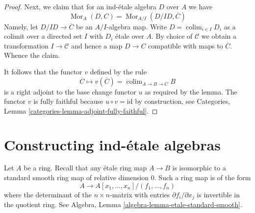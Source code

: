 \documentclass{stacks-project}
\theoremstyle{plain}
\theoremstyle{definition}
\theoremstyle{remark}
\numberwithin{equation}{subsection}
\def\colim{\mathop{\mathrm{colim}}\nolimits}
\def\Mor{\mathop{\mathrm{Mor}}\nolimits}
\begin{document}
\begin{proof}
\medskip\noindent
Next, we claim that for an ind-\'etale algebra $D$ over $A$ we have
$$
\Mor_A(D, C) = \Mor_{A/I}(D/ID, \overline{C})
$$
Namely, let $D/ID \to \overline{C}$ be an $A/I$-algebra map.
Write $D = \colim_{i \in I} D_i$ as a colimit over a directed set $I$
with $D_i$ \'etale over $A$. By choice of $\mathcal{C}$
we obtain a transformation $I \to \mathcal{C}$ and hence a map
$D \to C$ compatible with maps to $\overline{C}$. Whence the claim.

\medskip\noindent
It follows that the functor $v$ defined by the rule
$$
\overline{C} 
\longmapsto
v(\overline{C}) = \colim_{A \to B \to \overline{C}} B
$$
is a right adjoint to the base change functor $u$ as required by the lemma.
The functor $v$ is fully faithful because
$u \circ v = \text{id}$ by construction, see
Categories, Lemma \ref{categories-lemma-adjoint-fully-faithful}.
\end{proof}









\section{Constructing ind-\'etale algebras}
\label{section-construction-ind-etale}

\noindent
Let $A$ be a ring. Recall that any \'etale ring map $A \to B$ is isomorphic
to a standard smooth ring map of relative dimension $0$. Such a ring map
is of the form
$$
A \longrightarrow A[x_1, \ldots, x_n]/(f_1, \ldots, f_n)
$$
where the determinant of the $n \times n$-matrix with entries
$\partial f_i/\partial x_j$ is invertible in the quotient ring. See
Algebra, Lemma \ref{algebra-lemma-etale-standard-smooth}.
\end{document}
